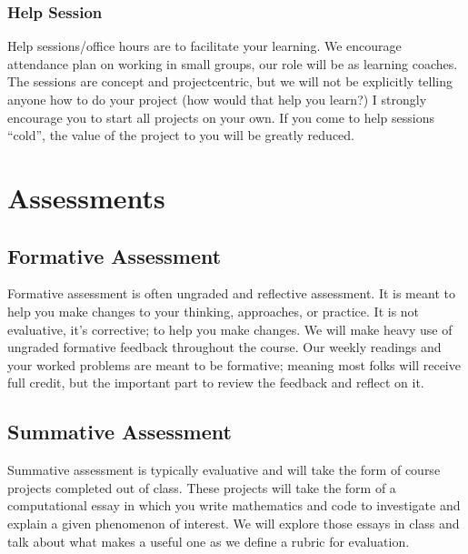\documentclass[letterpaper,10pt,english]{jupyterBook}
\begin{document}
\subsubsection{Help Session}
\label{\detokenize{content/0_course/2_design:help-session}}
\sphinxAtStartPar
Help sessions/office hours are to facilitate your learning. We encourage attendance \sphinxhyphen{} plan on working in small groups, our role will be as learning coaches. The sessions are concept and project\sphinxhyphen{}centric, but we will not be explicitly telling anyone how to do your project (how would that help you learn?) I strongly encourage you to start all projects on your own. If you come to help sessions “cold”, the value of the project to you will be greatly reduced.

\sphinxstepscope


\section{Assessments}
\label{\detokenize{content/0_course/3_assessments:assessments}}\label{\detokenize{content/0_course/3_assessments::doc}}

\subsection{Formative Assessment}
\label{\detokenize{content/0_course/3_assessments:formative-assessment}}
\sphinxAtStartPar
Formative assessment is often ungraded and reflective assessment. It is meant to help you make changes to your thinking, approaches, or practice. It is not evaluative, it’s corrective; to help you make changes. We will make heavy use of ungraded formative feedback throughout the course. Our weekly readings and your worked problems are meant to be formative; meaning most folks will receive full credit, but the important part to review the feedback and reflect on it.


\subsection{Summative Assessment}
\label{\detokenize{content/0_course/3_assessments:summative-assessment}}
\sphinxAtStartPar
Summative assessment is typically evaluative and will take the form of course projects completed out of class. These projects will take the form of a computational essay in which you write mathematics and code to investigate and explain a given phenomenon of interest. We will explore those essays in class and talk about what makes a useful one as we define a rubric for evaluation.
\end{document}
